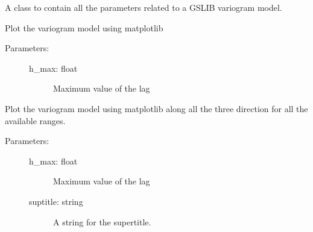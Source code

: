 \documentclass[letterpaper,10pt,english]{sphinxmanual}
\begin{document}
\begin{fulllineitems}
\label{\detokenize{appendices:s2Dcd.gslibnumpy.Variogram}}
A class to contain all the parameters related to a GSLIB variogram
model.

\begin{fulllineitems}
\label{\detokenize{appendices:s2Dcd.gslibnumpy.Variogram.plot}}
Plot the variogram model using matplotlib
\begin{description}
\item[{Parameters:}] \leavevmode\begin{description}
\item[{h\_max: float}] \leavevmode
Maximum value of the lag

\end{description}

\end{description}

\end{fulllineitems}


\begin{fulllineitems}
\label{\detokenize{appendices:s2Dcd.gslibnumpy.Variogram.plot_3dir}}
Plot the variogram model using matplotlib along all the three
direction for all the available ranges.
\begin{description}
\item[{Parameters:}] \leavevmode\begin{description}
\item[{h\_max: float}] \leavevmode
Maximum value of the lag

\item[{suptitle: string}] \leavevmode
A string for the super\sphinxhyphen{}title.

\end{description}


\end{description}
\end{fulllineitems}
\end{fulllineitems}
\end{document}
